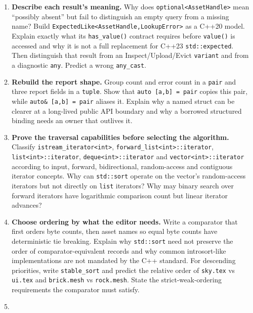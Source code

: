 \begin{enumerate}
\def\labelenumi{\arabic{enumi}.}
\item
  \textbf{Describe each result's meaning.} Why does \texttt{optional\textless{}AssetHandle\textgreater{}} mean ``possibly absent'' but fail to distinguish an empty query from a missing name? Build \texttt{ExpectedLike\textless{}AssetHandle,LookupError\textgreater{}} as a C++20 model. Explain exactly what its \texttt{has\_value()} contract requires before \texttt{value()} is accessed and why it is not a full replacement for C++23 \texttt{std::expected}. Then distinguish that result from an Inspect/Upload/Evict \texttt{variant} and from a diagnostic \texttt{any}. Predict a wrong \texttt{any\_cast}.
\item
  \textbf{Rebuild the report shape.} Group count and error count in a \texttt{pair} and three report fields in a \texttt{tuple}. Show that \texttt{auto\ {[}a,b{]}\ =\ pair} copies this pair, while \texttt{auto\&\ {[}a,b{]}\ =\ pair} aliases it. Explain why a named struct can be clearer at a long-lived public API boundary and why a borrowed structured binding needs an owner that outlives it.
\item
  \textbf{Prove the traversal capabilities before selecting the algorithm.} Classify \texttt{istream\_iterator\textless{}int\textgreater{}}, \texttt{forward\_list\textless{}int\textgreater{}::iterator}, \texttt{list\textless{}int\textgreater{}::iterator}, \texttt{deque\textless{}int\textgreater{}::iterator} and \texttt{vector\textless{}int\textgreater{}::iterator} according to input, forward, bidirectional, random-access and contiguous iterator concepts. Why can \texttt{std::sort} operate on the vector's random-access iterators but not directly on \texttt{list} iterators? Why may binary search over forward iterators have logarithmic comparison count but linear iterator advances?
\item
  \textbf{Choose ordering by what the editor needs.} Write a comparator that first orders byte counts, then asset names so equal byte counts have deterministic tie breaking. Explain why \texttt{std::sort} need not preserve the order of comparator-equivalent records and why common introsort-like implementations are not mandated by the C++ standard. For descending priorities, write \texttt{stable\_sort} and predict the relative order of \texttt{sky.tex} vs \texttt{ui.tex} and \texttt{brick.mesh} vs \texttt{rock.mesh}. State the strict-weak-ordering requirements the comparator must satisfy.
\item

\end{enumerate}
